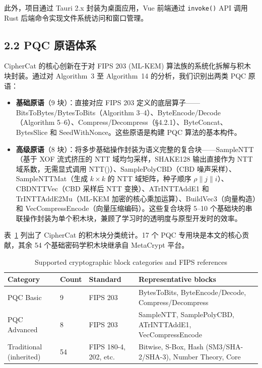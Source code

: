 \documentclass[preprint,12pt,a4paper]{elsarticle}
\begin{document}
此外，项目通过 Tauri 2.x \cite{tauri} 封装为桌面应用，Vue 前端通过 \texttt{invoke()} API 调用 Rust 后端命令实现文件系统访问和窗口管理。

\subsection*{2.2 PQC 原语体系}

CipherCat 的核心创新在于对 FIPS 203 (ML-KEM) 算法族的系统化拆解与积木块封装。通过对 Algorithm~3 至 Algorithm~14 的分析，我们识别出两类 PQC 原语：

\begin{itemize}
	\item \textbf{基础原语}（9 块）：直接对应 FIPS 203 定义的底层算子——BitsToBytes/BytesToBits（Algorithm 3--4）、ByteEncode/Decode（Algorithm 5--6）、Compress/Decompress（\S4.2.1）、ByteConcat、BytesSlice 和 SeedWithNonce。这些原语是构建 PQC 算法的基本构件。
	\item \textbf{高级原语}（8 块）：将多步基础操作封装为语义完整的复合块——SampleNTT（基于 XOF 流式挤压的 NTT 域均匀采样，SHAKE128 输出直接作为 NTT 域系数，无需显式调用 NTT()）、SamplePolyCBD（CBD 噪声采样）、SampleNTTMat（生成 $k \times k$ 的 NTT 域矩阵，种子顺序 $\rho \| j \| i$）、CBDNTTVec（CBD 采样后 NTT 变换）、ATrINTTAddE1 和 TrINTTAddE2Mu（ML-KEM 加密的核心乘加运算）、BuildVec3（向量构造）和 VecCompressEncode（向量压缩编码）。这些复合块将 5--10 个基础块的串联操作封装为单个积木块，兼顾了学习时的透明度与原型开发时的效率。
\end{itemize}

表~\ref{tab:blocks} 列出了 CipherCat 的积木块分类统计。17 个 PQC 专用块是本文的核心贡献，其余 54 个基础密码学积木块继承自 MetaCrypt 平台。

\begin{table}[htbp]
	\centering
	\caption{Supported cryptographic block categories and FIPS references}
	\label{tab:blocks}
	\begin{tabular}{|l|l|l|p{5cm}|}
		\hline
		\textbf{Category}       & \textbf{Count} & \textbf{Standard}     & \textbf{Representative blocks}                              \\
		\hline
		PQC Basic               & 9              & FIPS 203              & BytesToBits, ByteEncode/Decode, Compress/Decompress         \\
		\hline
		PQC Advanced            & 8              & FIPS 203              & SampleNTT, SamplePolyCBD, ATrINTTAddE1, VecCompressEncode   \\
		\hline
		Traditional (inherited) & 54             & FIPS 180-4, 202, etc. & Bitwise, S-Box, Hash (SM3/SHA-2/SHA-3), Number Theory, Core \\
		\hline
	\end{tabular}
\end{table}
\end{document}
